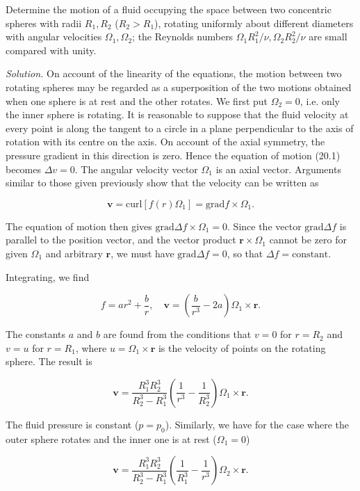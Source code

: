 \documentclass{article}
\begin{document}
Determine the motion of a fluid occupying the space between two concentric spheres with radii $R_1, R_2$ ($R_2 > R_1$), rotating uniformly about different diameters with angular velocities $\Omega_1, \Omega_2$; the Reynolds numbers $\Omega_1 R_1^2/\nu, \Omega_2 R_2^2/\nu$ are small compared with unity.

\textit{Solution.} On account of the linearity of the equations, the motion between two rotating spheres may be regarded as a superposition of the two motions obtained when one sphere is at rest and the other rotates. We first put $\Omega_2 = 0$, i.e. only the inner sphere is rotating. It is reasonable to suppose that the fluid velocity at every point is along the tangent to a circle in a plane perpendicular to the axis of rotation with its centre on the axis. On account of the axial symmetry, the pressure gradient in this direction is zero. Hence the equation of motion (20.1) becomes $\Delta v = 0$. The angular velocity vector $\Omega_1$ is an axial vector. Arguments similar to those given previously show that the velocity can be written as

$$
\mathbf{v} = \text{curl} [f(r) \Omega_1] = \text{grad} f \times \Omega_1.
$$

The equation of motion then gives $\text{grad} \Delta f \times \Omega_1 = 0$. Since the vector $\text{grad} \Delta f$ is parallel to the position vector, and the vector product $\mathbf{r} \times \Omega_1$ cannot be zero for given $\Omega_1$ and arbitrary $\mathbf{r}$, we must have $\text{grad} \Delta f = 0$, so that $\Delta f = \text{constant}$.

Integrating, we find

$$
f = ar^2 + \frac{b}{r}, \quad \mathbf{v} = \left( \frac{b}{r^3} - 2a \right) \Omega_1 \times \mathbf{r}.
$$

The constants $a$ and $b$ are found from the conditions that $v = 0$ for $r = R_2$ and $v = u$ for $r = R_1$, where $u = \Omega_1 \times \mathbf{r}$ is the velocity of points on the rotating sphere. The result is

$$
\mathbf{v} = \frac{R_1^3 R_2^3}{R_2^3 - R_1^3} \left( \frac{1}{r^3} - \frac{1}{R_2^3} \right) \Omega_1 \times \mathbf{r}.
$$

The fluid pressure is constant ($p = p_0$). Similarly, we have for the case where the outer sphere rotates and the inner one is at rest ($\Omega_1 = 0$)

$$
\mathbf{v} = \frac{R_1^3 R_2^3}{R_2^3 - R_1^3} \left( \frac{1}{R_1^3} - \frac{1}{r^3} \right) \Omega_2 \times \mathbf{r}.
$$
\end{document}
